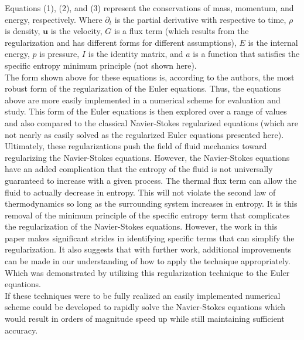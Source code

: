 \documentclass{article}
\begin{document}
Equations (1), (2), and (3) represent the conservations of mass, momentum, and energy, respectively.
Where $\partial_t$ is the partial derivative with respective to time, $\rho$ is density, $\mathbf{u}$ is the velocity,
$G$ is a flux term  (which results from the regularization and has different forms for different assumptions), $E$ is the internal energy, $p$ is pressure, $I$ is the identity matrix, and $a$ is a function that satisfies the specific
 entropy minimum principle (not shown here).
\\

 The form shown above for these equations is, according to the authors, the most robust form of the regularization of the Euler equations. Thus, the equations above are more easily
 implemented in a numerical scheme for evaluation and study. This form of the Euler equations is then explored over a range of values and also compared to the classical Navier-Stokes regularized equations (which are not nearly as easily solved as the regularized Euler equations presented here).
\\

 Ultimately, these regularizations push the field of fluid mechanics toward regularizing the Navier-Stokes equations. However, the Navier-Stokes equations have an added
 complication that the entropy of the fluid is not universally guaranteed to increase with a given process. The thermal flux term can allow the fluid to actually decrease in entropy.
  This will not violate the second law of thermodynamics so long as the surrounding system increases in entropy.
  It is this removal of the minimum principle of the specific entropy term that complicates the regularization of the Navier-Stokes equations.
  However, the work in this paper makes significant strides in identifying specific terms that can simplify the regularization. It also suggests that
  with further work, additional improvements can be made in our understanding of how to apply the technique appropriately.
  Which was demonstrated by utilizing this regularization technique to the Euler equations.
\\

If these techniques were to be fully realized an easily implemented numerical scheme could be developed to rapidly solve the Navier-Stokes equations which would result in orders of
magnitude speed up while still maintaining sufficient accuracy.
\end{document}
